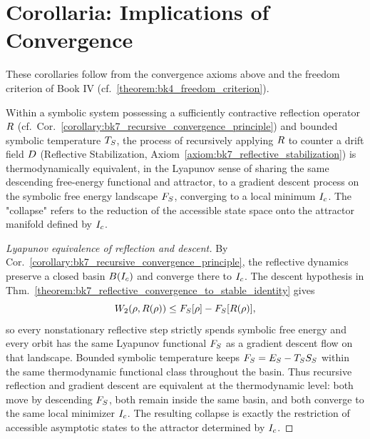 \section{Corollaria: Implications of Convergence}
\label{sec:bk7_corollaria_implications_of_convergence}
These corollaries follow from the convergence axioms above and the freedom criterion of Book IV (cf.~\ref{theorem:bk4_freedom_criterion}).
\begin{corollary}
\label{corollary:bk7_drift_collapse_equivalence}
Within a symbolic system possessing a sufficiently contractive reflection operator \(R\) (cf.~Cor.~\ref{corollary:bk7_recursive_convergence_principle}) and bounded symbolic temperature \(T_S\), the process of recursively applying \(R\) to counter a drift field \(D\) (Reflective Stabilization, Axiom~\ref{axiom:bk7_reflective_stabilization}) is thermodynamically equivalent, in the Lyapunov sense of sharing the same descending free-energy functional and attractor, to a gradient descent process on the symbolic free energy landscape \(F_S\), converging to a local minimum \(I_c\). The "collapse" refers to the reduction of the accessible state space onto the attractor manifold defined by \(I_c\).
\end{corollary}
\begin{proof}[Lyapunov equivalence of reflection and descent]
\label{proof:bk7_drift_collapse_equivalence}
\leavevmode
By Cor.~\ref{corollary:bk7_recursive_convergence_principle}, the reflective dynamics preserve a closed basin \(B(I_c)\) and converge there to \(I_c\). The descent hypothesis in Thm.~\ref{theorem:bk7_reflective_convergence_to_stable_identity} gives
\[
W_2(\rho,R(\rho))\leq F_S[\rho]-F_S[R(\rho)],
\]
so every nonstationary reflective step strictly spends symbolic free energy and every orbit has the same Lyapunov functional \(F_S\) as a gradient descent flow on that landscape. Bounded symbolic temperature keeps \(F_S=E_S-T_SS_S\) within the same thermodynamic functional class throughout the basin. Thus recursive reflection and gradient descent are equivalent at the thermodynamic level: both move by descending \(F_S\), both remain inside the same basin, and both converge to the same local minimizer \(I_c\). The resulting collapse is exactly the restriction of accessible asymptotic states to the attractor determined by \(I_c\).
\end{proof}
